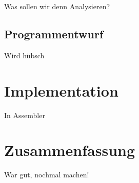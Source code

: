 Was sollen wir denn Analysieren?


\section{Programmentwurf}

Wird hübsch

\chapter{Implementation}

In Assembler

\chapter{Zusammenfassung}

War gut, nochmal machen!


